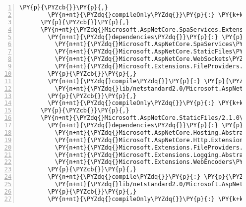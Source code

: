 \begin{Verbatim}[commandchars=\\\{\},numbers=left,firstnumber=1,stepnumber=1,numberblanklines=0]
        \PY{p}{\PYZcb{}}\PY{p}{,}
        \PY{n+nt}{\PYZdq{}compileOnly\PYZdq{}}\PY{p}{:} \PY{k+kc}{true}
      \PY{p}{\PYZcb{}}\PY{p}{,}
      \PY{n+nt}{\PYZdq{}Microsoft.AspNetCore.SpaServices.Extensions/2.1.0\PYZhy{}rc1\PYZhy{}final\PYZdq{}}\PY{p}{:} \PY{p}{\PYZob{}}
        \PY{n+nt}{\PYZdq{}dependencies\PYZdq{}}\PY{p}{:} \PY{p}{\PYZob{}}
          \PY{n+nt}{\PYZdq{}Microsoft.AspNetCore.SpaServices\PYZdq{}}\PY{p}{:} \PY{l+s+s2}{\PYZdq{}2.1.0\PYZhy{}rc1\PYZhy{}final\PYZdq{}}\PY{p}{,}
          \PY{n+nt}{\PYZdq{}Microsoft.AspNetCore.StaticFiles\PYZdq{}}\PY{p}{:} \PY{l+s+s2}{\PYZdq{}2.1.0\PYZhy{}rc1\PYZhy{}final\PYZdq{}}\PY{p}{,}
          \PY{n+nt}{\PYZdq{}Microsoft.AspNetCore.WebSockets\PYZdq{}}\PY{p}{:} \PY{l+s+s2}{\PYZdq{}2.1.0\PYZhy{}rc1\PYZhy{}final\PYZdq{}}\PY{p}{,}
          \PY{n+nt}{\PYZdq{}Microsoft.Extensions.FileProviders.Physical\PYZdq{}}\PY{p}{:} \PY{l+s+s2}{\PYZdq{}2.1.0\PYZhy{}rc1\PYZhy{}final\PYZdq{}}
        \PY{p}{\PYZcb{}}\PY{p}{,}
        \PY{n+nt}{\PYZdq{}compile\PYZdq{}}\PY{p}{:} \PY{p}{\PYZob{}}
          \PY{n+nt}{\PYZdq{}lib/netstandard2.0/Microsoft.AspNetCore.SpaServices.Extensions.dll\PYZdq{}}\PY{p}{:} \PY{p}{\PYZob{}}\PY{p}{\PYZcb{}}
        \PY{p}{\PYZcb{}}\PY{p}{,}
        \PY{n+nt}{\PYZdq{}compileOnly\PYZdq{}}\PY{p}{:} \PY{k+kc}{true}
      \PY{p}{\PYZcb{}}\PY{p}{,}
      \PY{n+nt}{\PYZdq{}Microsoft.AspNetCore.StaticFiles/2.1.0\PYZhy{}rc1\PYZhy{}final\PYZdq{}}\PY{p}{:} \PY{p}{\PYZob{}}
        \PY{n+nt}{\PYZdq{}dependencies\PYZdq{}}\PY{p}{:} \PY{p}{\PYZob{}}
          \PY{n+nt}{\PYZdq{}Microsoft.AspNetCore.Hosting.Abstractions\PYZdq{}}\PY{p}{:} \PY{l+s+s2}{\PYZdq{}2.1.0\PYZhy{}rc1\PYZhy{}final\PYZdq{}}\PY{p}{,}
          \PY{n+nt}{\PYZdq{}Microsoft.AspNetCore.Http.Extensions\PYZdq{}}\PY{p}{:} \PY{l+s+s2}{\PYZdq{}2.1.0\PYZhy{}rc1\PYZhy{}final\PYZdq{}}\PY{p}{,}
          \PY{n+nt}{\PYZdq{}Microsoft.Extensions.FileProviders.Abstractions\PYZdq{}}\PY{p}{:} \PY{l+s+s2}{\PYZdq{}2.1.0\PYZhy{}rc1\PYZhy{}final\PYZdq{}}\PY{p}{,}
          \PY{n+nt}{\PYZdq{}Microsoft.Extensions.Logging.Abstractions\PYZdq{}}\PY{p}{:} \PY{l+s+s2}{\PYZdq{}2.1.0\PYZhy{}rc1\PYZhy{}final\PYZdq{}}\PY{p}{,}
          \PY{n+nt}{\PYZdq{}Microsoft.Extensions.WebEncoders\PYZdq{}}\PY{p}{:} \PY{l+s+s2}{\PYZdq{}2.1.0\PYZhy{}rc1\PYZhy{}final\PYZdq{}}
        \PY{p}{\PYZcb{}}\PY{p}{,}
        \PY{n+nt}{\PYZdq{}compile\PYZdq{}}\PY{p}{:} \PY{p}{\PYZob{}}
          \PY{n+nt}{\PYZdq{}lib/netstandard2.0/Microsoft.AspNetCore.StaticFiles.dll\PYZdq{}}\PY{p}{:} \PY{p}{\PYZob{}}\PY{p}{\PYZcb{}}
        \PY{p}{\PYZcb{}}\PY{p}{,}
        \PY{n+nt}{\PYZdq{}compileOnly\PYZdq{}}\PY{p}{:} \PY{k+kc}{true}

\end{Verbatim}

